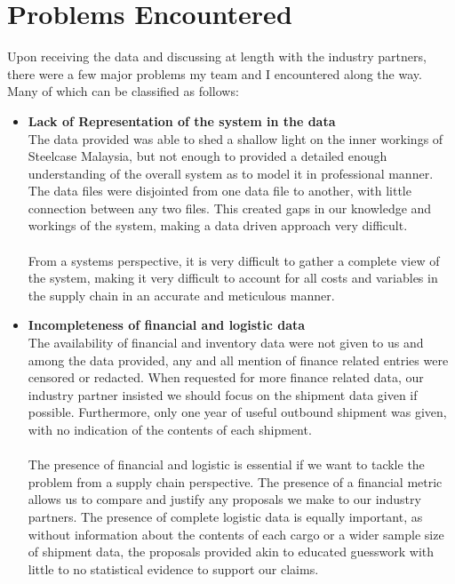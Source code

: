 \documentclass[a4paper, fleqn]{article}
\begin{document}
\section{Problems Encountered}

Upon receiving the data and discussing at length with the industry partners, there were a few major problems my team and I encountered along the way. Many of which can be classified as follows:\begin{itemize}
\item \textbf{Lack of Representation of the system in the data}\\
The data provided was able to shed a shallow light on the inner workings of Steelcase Malaysia, but not enough to provided a detailed enough understanding of the overall system as to model it in professional manner. The data files were disjointed from one data file to another, with little connection between any two files. This created gaps in our knowledge and workings of the system, making a data driven approach very difficult.\\
\vspace{1pt}\\
From a systems perspective, it is very difficult to gather a complete view of the system, making it very difficult to account for all costs and variables in the supply chain in an accurate and meticulous manner.
\item \textbf{Incompleteness of financial and logistic data}\\
The availability of financial and inventory data were not given to us and among the data provided, any and all mention of finance related entries were censored or redacted. When requested for more finance related data, our industry partner insisted we should focus on the shipment data given if possible. Furthermore, only one year of useful outbound shipment was given, with no indication of the contents of each shipment.\\
\vspace{1pt}\\
The presence of financial and logistic is essential if we want to tackle the problem from a supply chain perspective. The presence of a financial metric allows us to compare and justify any proposals we make to our industry partners. The presence of complete logistic data is equally important, as without information about the contents of each cargo or a wider sample size of shipment data, the proposals provided akin to educated guesswork with little to no statistical evidence to support our claims.

\end{itemize}
\end{document}
